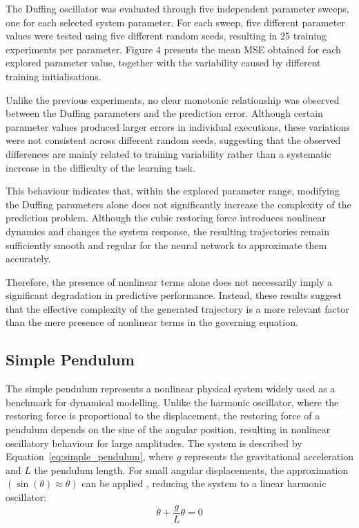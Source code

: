 The Duffing oscillator was evaluated through five independent parameter sweeps, one for each selected system parameter. For each sweep, five different parameter values were tested using five different random seeds, resulting in 25 training experiments per parameter. Figure 4 presents the mean MSE obtained for each explored parameter value, together with the variability caused by different training initialisations.

Unlike the previous experiments, no clear monotonic relationship was observed between the Duffing parameters and the prediction error. Although certain parameter values produced larger errors in individual executions, these variations were not consistent across different random seeds, suggesting that the observed differences are mainly related to training variability rather than a systematic increase in the difficulty of the learning task.

This behaviour indicates that, within the explored parameter range, modifying the Duffing parameters alone does not significantly increase the complexity of the prediction problem. Although the cubic restoring force introduces nonlinear dynamics and changes the system response, the resulting trajectories remain sufficiently smooth and regular for the neural network to approximate them accurately.

Therefore, the presence of nonlinear terms alone does not necessarily imply a significant degradation in predictive performance. Instead, these results suggest that the effective complexity of the generated trajectory is a more relevant factor than the mere presence of nonlinear terms in the governing equation.

\subsection{Simple Pendulum}
The simple pendulum represents a nonlinear physical system widely used as a benchmark for dynamical modelling. Unlike the harmonic oscillator, where the restoring force is proportional to the displacement, the restoring force of a pendulum depends on the sine of the angular position, resulting in nonlinear oscillatory behaviour for large amplitudes.
The system is described by Equation~\ref{eq:simple_pendulum}, where $g$ represents the gravitational acceleration and $L$ the pendulum length. For small angular displacements, the approximation $(\sin(\theta)\approx\theta)$ can be applied \cite{taylor_classical_mechanics}, reducing the system to a linear harmonic oscillator:
\begin{equation}
    \ddot{\theta}+\frac{g}{L}\theta=0
\end{equation}

